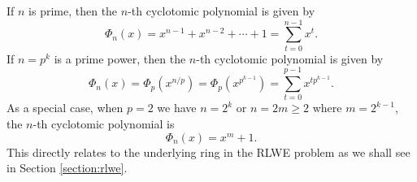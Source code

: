 \documentclass[../main.tex]{subfiles}
\begin{document}
\begin{remark}
\label{rmk:speCycPoly}
If $n$ is prime, then the $n$-th cyclotomic polynomial is given by
\begin{equation*}
    \Phi_n(x) = x^{n-1} + x^{n-2} + \cdots + 1 = \sum_{t=0}^{n-1} x^{t}.
\end{equation*}
If $n=p^k$ is a prime power, then the $n$-th cyclotomic polynomial is given by
\begin{equation*}
    \Phi_n(x) = \Phi_p(x^{n/p}) = \Phi_p(x^{p^{k-1}}) = \sum_{t=0}^{p-1} x^{tp^{k-1}}.
\end{equation*}
As a special case, when $p=2$ we have $n=2^k$ or $n= 2m \ge 2$ where $m=2^{k-1}$, the $n$-th cyclotomic polynomial is
\begin{equation*}
    \Phi_n(x) = x^{m}+1.
\end{equation*}
This directly relates to the underlying ring in the RLWE  problem as we shall see in Section \ref{section:rlwe}.
\end{remark}
\end{document}
